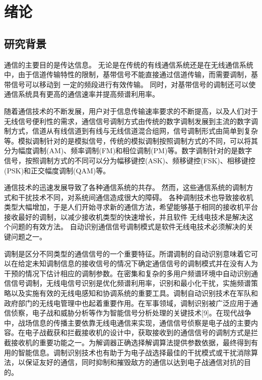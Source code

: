 
\chapter{绪论}
\section{研究背景}
通信的主要目的是传达信息。 无论是在传统的有线通信系统还是在无线通信系统中，由于信道传输特性的限制，基带信号不能直接通过信道传输，而需要调制，基带信号可以移动到 一定的频段进行有效传输。 同时，对基带信号的调制还可以使通信系统具有更高的通信速率并提高频谱利用率。\par

随着通信技术的不断发展，用户对于信息传输速率要求的不断提高，以及人们对于无线信号便利性的需求，通信信号调制方式由传统的数字调制发展到主流的数字调制方式，信道从有线信道到有线与无线信道混合组网，信号调制形式由简单到复杂等。模拟调制针对的是模拟信号，传统的模拟调制按照调制方式的不同，可以将其分为幅度调制(AM)、频率调制(FM)和相位调制(PM)等。数字调制针对的是数字信号，按照调制方式的不同可以分为幅移键控(ASK)、频移键控(FSK)、相移键控(PSK)和正交幅度调制(QAM)等。 \par

通信技术的迅速发展导致了各种通信系统的共存。 然而，这些通信系统的调制方式和干扰技术不同，对系统间通信造成很大的障碍。 各种调制技术也导致接收机类型大幅增加，于是人们开始寻求新的通信方法，希望能够基于相同的接收机平台接收最好的调制，以减少接收机类型的快速增长，并且软件 无线电技术是解决这个问题的有效方法。 自动识别通信信号调制模式是软件无线电技术必须解决的关键问题之一。\par

调制是区分不同类型的通信信号的一个重要特征。所谓调制的自动识别意味着它可以在给定未知调制信息的接收信号的情况下确定通信信号的调制模式并在没有人为干预的情况下估计相应的调制参数。在密集和复杂的多用户频谱环境中自动识别通信信号调制，无线电信号识别是优化频谱利用率，识别和最小化干扰，实施频谱策略以及实施有效的无线电感知和协调系统的重要工具。调制自动识别技术在军队和政府部门的无线电管理中也起着重要作用。在军事领域，调制识别被广泛应用于通信侦察，电子战和威胁分析等作为智能信号分析处理的关键技术[9]。在现代战争中，战场信息的传播主要依靠无线电通信来实现，通信信号侦察是电子战的主要内容。在电子战截获和拦截接收机的设计中，获取接收到的通信信号的调制方式是拦截接收机的重要功能之一。为解调器正确选择解调算法提供参数依据，最终得到有用的智能信息。调制识别技术也有助于为电子战选择最佳的干扰模式或干扰消除算法，以保证友好的通信，同时抑制和摧毁敌方的通信以达到电子战通信对抗的目的。\par

